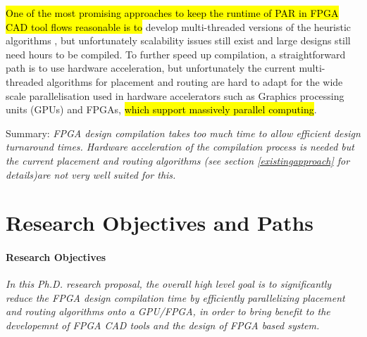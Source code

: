 \documentclass[a4paper,oneside,12pt]{article}
\begin{document}

\hl{One of the most promising approaches to keep the runtime of PAR in FPGA CAD tool flows reasonable is to} develop multi-threaded versions of the heuristic algorithms \cite{ludwin2011,gort2012,betz2013method,jain2014multi}, but unfortunately scalability issues still exist and large designs still need hours to be compiled. To further speed up compilation, a straightforward path is to use hardware acceleration, but unfortunately the current multi-threaded algorithms for placement and routing are hard to adapt for the wide scale parallelisation used in hardware accelerators such as Graphics processing units (GPUs) and FPGAs, \hl{which support massively parallel computing}.

Summary: \emph{FPGA design compilation takes too much time to allow efficient design turnaround times. Hardware acceleration of the compilation process is needed but the current placement and routing algorithms (see section \ref{existingapproach} for details)are not very well suited for this.
}

\section{Research Objectives and Paths}

\paragraph{Research Objectives}
\emph{In this Ph.D. research proposal, the overall high level goal is to significantly reduce the FPGA design compilation time by efficiently parallelizing placement and routing algorithms onto a GPU/FPGA, in order to bring benefit to the developemnt of FPGA CAD tools and the design of FPGA based system. }
\end{document}
